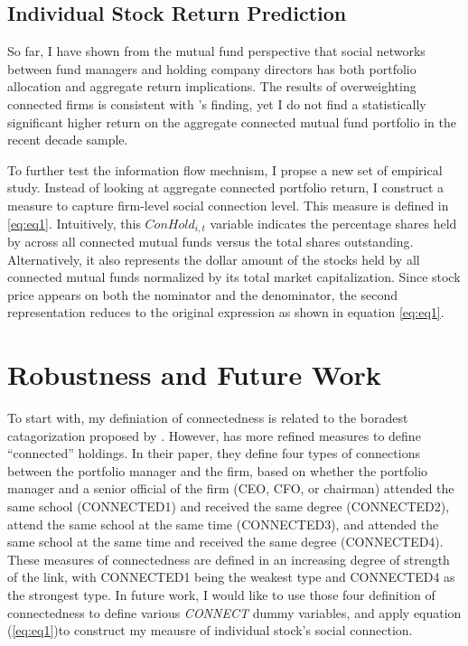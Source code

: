 \documentclass[11pt]{article}
\begin{document}
\begin{doublespace}
\subsection{Individual Stock Return Prediction}
So far, I have shown from the mutual fund perspective that social networks between fund managers and holding company directors has both portfolio allocation and aggregate return implications. The results of overweighting connected firms is consistent with 
\cite{cohen2008small} 's finding, yet I do not find a statistically significant higher return on the aggregate connected mutual fund portfolio in the recent decade sample. 

To further test the information flow mechnism, I propse a new set of empirical study. Instead of looking at aggregate connected portfolio return, I construct a measure to capture firm-level social connection level. This measure is defined in \ref{eq:eq1}. Intuitively, this $ConHold_{i,t}$ variable indicates the percentage shares held by across all connected mutual funds versus the total shares outstanding. Alternatively, it also represents the dollar amount of the stocks held by all connected mutual funds normalized by its total market capitalization. Since stock price appears on both the nominator and the denominator, the second representation reduces to the original expression as shown in equation \ref{eq:eq1}.





\section{Robustness and Future Work}
To start with, my definiation of connectedness is related to the boradest catagorization proposed by \cite{cohen2008small}. However, \cite{cohen2008small} has more refined measures to define ``connected'' holdings. In their paper, they define four types of connections between the portfolio manager and the firm, based on whether the portfolio manager and a senior official of the firm (CEO, CFO, or chairman) attended the same school (CONNECTED1) and received the same degree (CONNECTED2), attend the same school at the same time (CONNECTED3), and attended the same school at the same time and received the same degree (CONNECTED4). These measures of connectedness are defined in an increasing degree of strength of the link, with CONNECTED1 being the weakest type and CONNECTED4 as the strongest type. In future work, I would like to use those four definition of connectedness to define various \emph{CONNECT} dummy variables, and apply equation (\ref{eq:eq1})to construct my meausre of individual stock's social connection. 


\end{doublespace}
\end{document}
